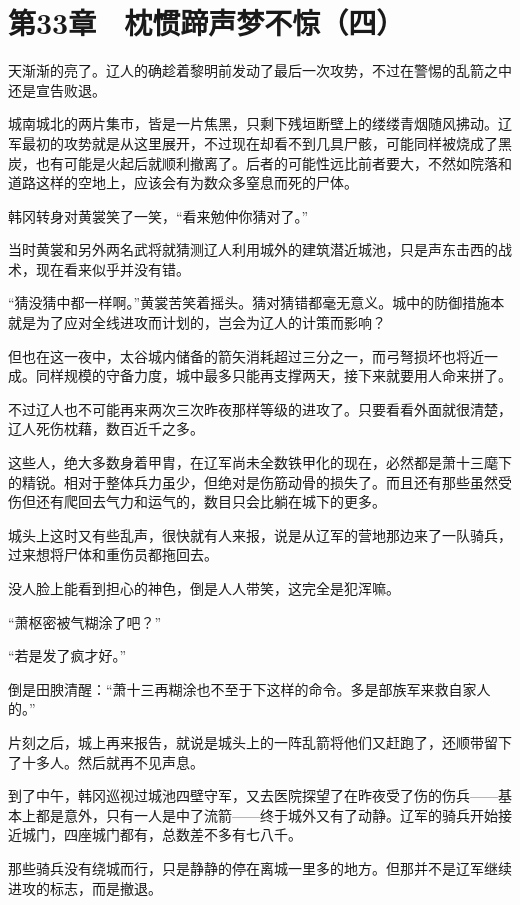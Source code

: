 \section{第33章　枕惯蹄声梦不惊（四）}

天渐渐的亮了。辽人的确趁着黎明前发动了最后一次攻势，不过在警惕的乱箭之中还是宣告败退。

城南城北的两片集市，皆是一片焦黑，只剩下残垣断壁上的缕缕青烟随风拂动。辽军最初的攻势就是从这里展开，不过现在却看不到几具尸骸，可能同样被烧成了黑炭，也有可能是火起后就顺利撤离了。后者的可能性远比前者要大，不然如院落和道路这样的空地上，应该会有为数众多窒息而死的尸体。

韩冈转身对黄裳笑了一笑，“看来勉仲你猜对了。”

当时黄裳和另外两名武将就猜测辽人利用城外的建筑潜近城池，只是声东击西的战术，现在看来似乎并没有错。

“猜没猜中都一样啊。”黄裳苦笑着摇头。猜对猜错都毫无意义。城中的防御措施本就是为了应对全线进攻而计划的，岂会为辽人的计策而影响？

但也在这一夜中，太谷城内储备的箭矢消耗超过三分之一，而弓弩损坏也将近一成。同样规模的守备力度，城中最多只能再支撑两天，接下来就要用人命来拼了。

不过辽人也不可能再来两次三次昨夜那样等级的进攻了。只要看看外面就很清楚，辽人死伤枕藉，数百近千之多。

这些人，绝大多数身着甲胄，在辽军尚未全数铁甲化的现在，必然都是萧十三麾下的精锐。相对于整体兵力虽少，但绝对是伤筋动骨的损失了。而且还有那些虽然受伤但还有爬回去气力和运气的，数目只会比躺在城下的更多。

城头上这时又有些乱声，很快就有人来报，说是从辽军的营地那边来了一队骑兵，过来想将尸体和重伤员都拖回去。

没人脸上能看到担心的神色，倒是人人带笑，这完全是犯浑嘛。

“萧枢密被气糊涂了吧？”

“若是发了疯才好。”

倒是田腴清醒：“萧十三再糊涂也不至于下这样的命令。多是部族军来救自家人的。”

片刻之后，城上再来报告，就说是城头上的一阵乱箭将他们又赶跑了，还顺带留下了十多人。然后就再不见声息。

到了中午，韩冈巡视过城池四壁守军，又去医院探望了在昨夜受了伤的伤兵——基本上都是意外，只有一人是中了流箭——终于城外又有了动静。辽军的骑兵开始接近城门，四座城门都有，总数差不多有七八千。

那些骑兵没有绕城而行，只是静静的停在离城一里多的地方。但那并不是辽军继续进攻的标志，而是撤退。

